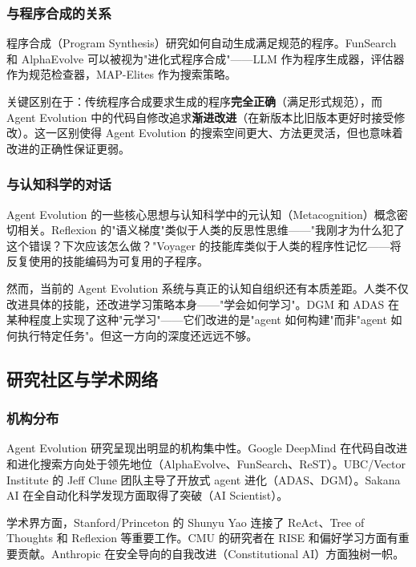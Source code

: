 \subsubsection{与程序合成的关系}

程序合成（Program Synthesis）研究如何自动生成满足规范的程序。FunSearch 和 AlphaEvolve 可以被视为"进化式程序合成"——LLM 作为程序生成器，评估器作为规范检查器，MAP-Elites 作为搜索策略。

关键区别在于：传统程序合成要求生成的程序\textbf{完全正确}（满足形式规范），而 Agent Evolution 中的代码自修改追求\textbf{渐进改进}（在新版本比旧版本更好时接受修改）。这一区别使得 Agent Evolution 的搜索空间更大、方法更灵活，但也意味着改进的正确性保证更弱。

\subsubsection{与认知科学的对话}

Agent Evolution 的一些核心思想与认知科学中的元认知（Metacognition）概念密切相关。Reflexion 的"语义梯度"类似于人类的反思性思维——"我刚才为什么犯了这个错误？下次应该怎么做？"Voyager 的技能库类似于人类的程序性记忆——将反复使用的技能编码为可复用的子程序。

然而，当前的 Agent Evolution 系统与真正的认知自组织还有本质差距。人类不仅改进具体的技能，还改进学习策略本身——"学会如何学习"。DGM 和 ADAS 在某种程度上实现了这种"元学习"——它们改进的是"agent 如何构建"而非"agent 如何执行特定任务"。但这一方向的深度还远远不够。

\subsection{研究社区与学术网络}\label{sec:intro-community}

\subsubsection{机构分布}

Agent Evolution 研究呈现出明显的机构集中性。Google DeepMind 在代码自改进和进化搜索方向处于领先地位（AlphaEvolve、FunSearch、ReST）。UBC/Vector Institute 的 Jeff Clune 团队主导了开放式 agent 进化（ADAS、DGM）。Sakana AI 在全自动化科学发现方面取得了突破（AI Scientist）。

学术界方面，Stanford/Princeton 的 Shunyu Yao 连接了 ReAct、Tree of Thoughts 和 Reflexion 等重要工作。CMU 的研究者在 RISE 和偏好学习方面有重要贡献。Anthropic 在安全导向的自我改进（Constitutional AI）方面独树一帜。

